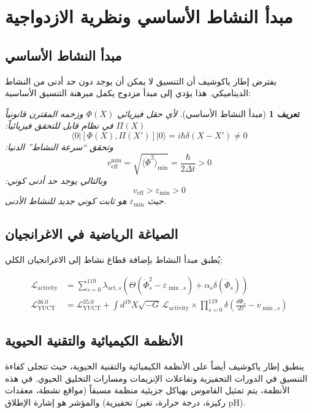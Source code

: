 \documentclass[11pt,a4paper]{article}
\newtheorem{definition}{تعريف}
\begin{document}
	\section{مبدأ النشاط الأساسي ونظرية الازدواجية}
	\label{sec:activity_principle}
	
	\subsection{مبدأ النشاط الأساسي}
	
	يفترض إطار ياكوشيف أن التنسيق لا يمكن أن يوجد دون حد أدنى من النشاط الديناميكي. هذا يؤدي إلى مبدأ مزدوج يكمل مبرهنة التنسيق الأساسية:
	
	\begin{definition}[مبدأ النشاط الأساسي]
		لأي حقل فيزيائي $\Phi(X)$ وزخمه المقترن قانونياً $\Pi(X)$ في نظام قابل للتحقق فيزيائياً:
		\[
		\langle 0 | [\Phi(X), \Pi(X')] | 0 \rangle = i\hbar\delta(X-X') \neq 0
		\]
		وتحقق ``سرعة النشاط'' الدنيا:
		\[
		v_{\mathrm{eff}}^{\min} = \sqrt{\langle \dot{\Phi}^2 \rangle_{\min}} = \frac{\hbar}{2\Delta t} > 0
		\]
		وبالتالي يوجد حد أدنى كوني:
		\[
		\boxed{v_{\mathrm{eff}} > \varepsilon_{\min} > 0}
		\]
		حيث $\varepsilon_{\min}$ هو ثابت كوني جديد للنشاط الأدنى.
	\end{definition}
	
	\subsection{الصياغة الرياضية في الاغرانجيان}
	
	يُطبق مبدأ النشاط بإضافة قطاع نشاط إلى الاغرانجيان الكلي:
	
	\begin{align}
		\mathcal{L}_{\mathrm{activity}} &= \sum_{s=0}^{119} \lambda_{\mathrm{act},s} \left( \Theta(\dot{\Phi}_s^2 - \varepsilon_{\min,s}) + \alpha_s \delta(\dot{\Phi}_s) \right) \\
		\mathcal{L}_{\mathrm{YUCT}}^{36.0} &= \mathcal{L}_{\mathrm{YUCT}}^{35.0} + \int d^{19}X \sqrt{-G} \, \mathcal{L}_{\mathrm{activity}} \times \prod_{s=0}^{119} \delta\left( \frac{d\Phi_s}{d\tau} - v_{\min,s} \right)
	\end{align}
	
	\subsection{الأنظمة الكيميائية والتقنية الحيوية}
	\label{subsec:chemical-systems}
	
	ينطبق إطار ياكوشيف أيضاً على الأنظمة الكيميائية والتقنية الحيوية، حيث تتجلى كفاءة التنسيق في الدورات التحفيزية وتفاعلات الإنزيمات ومسارات التخليق الحيوي. في هذه الأنظمة، يتم تمثيل القاموس بهياكل جزيئية منظمة مسبقاً (مواقع نشطة، معقدات تحفيزية) والمؤشر هو إشارة الإطلاق (ركيزة، درجة حرارة، تغير pH).
	
\end{document}
